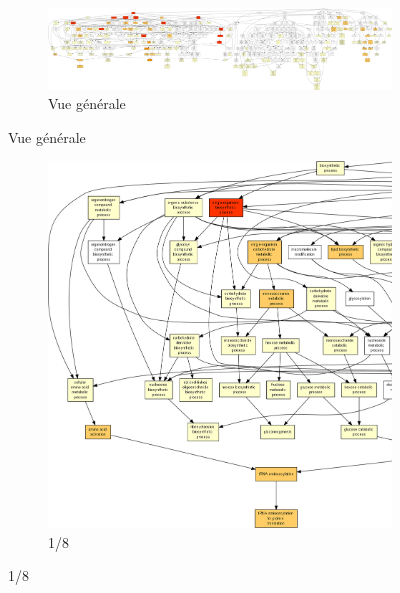 \begin{figure}
\begin{subfigure}{\textwidth}
\includegraphics[width=\textwidth]
{Figures/hlc-go-all-graph/hlc-go-all-graph.png}
\caption{Vue générale}
\end{subfigure}
\end{figure}

\begin{figure}[p]
\ContinuedFloat
\begin{subfigure}{\textwidth}
\includegraphics[width=\textwidth]
{Figures/hlc-go-all-graph/hlc-go-all-graph_0.png}
\caption{1/8}
\end{subfigure}
\end{figure}

